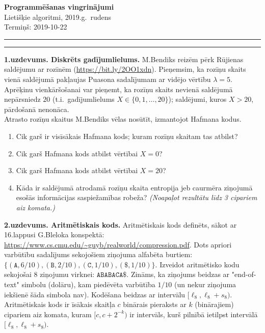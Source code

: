 \documentclass[a4paper,12pt]{article}
\begin{document}
\thispagestyle{empty}

\begin{center}
{\bf\Huge Programmēšanas vingrinājumi} \\[5pt]
Lietišķie algoritmi, 2019.g.\ rudens\\
Termiņš: 2019-10-22
\end{center}

\hrule
\vspace{2pt}
\hrule
\vspace{12pt}


\noindent
{\bf 1.uzdevums. Diskrēts gadījumlielums.}
M.Bendiks reizēm pērk Rūjienas saldējumu ar rozīnēm (\url{https://bit.ly/2OO1xdn}).
Pieņemsim, ka rozīņu skaits vienā saldējumā pakļaujas Puasona sadalījumam 
ar vidējo vērtību $\lambda = 5$. Aprēķinu vienkāršošanai var pieņemt, ka
rozīņu skaits nevienā saldējumā nepārsniedz $20$ (t.i.\ gadījumlielums
$X \in \{ 0,1,\ldots,20 \}$); saldējumi, kuros $X > 20$, 
pārdošanā nenonāca.\\
Atrasto rozīņu skaitus M.Bendiks vēlas nosūtīt, izmantojot Hafmana kodus. 
\begin{enumerate}[label=(\alph*)]
\item Cik garš ir visīsākais Hafmana kods; kuram rozīņu skaitam tas atbilst?
\item Cik garš Hafmana kods atbilst vērtībai $X=0$?
\item Cik garš Hafmana kods atbilst vērtībai $X=20$?
\item Kāda ir saldējumā atrodamā rozīņu skaita entropija jeb caurmēra ziņojumā
esošās informācijas saspiežamības robeža? {\em (Noapaļot rezultātu līdz 3 cipariem 
aiz komata.)}
\end{enumerate}

\vspace{6pt}
{\bf 2.uzdevums. Aritmētiskais kods.}
Aritmētiskais kods definēts, sākot ar 16.lappusi G.Bleloka konspektā: 
\url{https://www.cs.cmu.edu/~guyb/realworld/compression.pdf}. 
Dots apriori varbūtību sadalījums sekojošiem ziņojuma alfabēta 
burtiem: $\{ (\mathtt{A},6/10), (\mathtt{B},2/10), (\mathtt{C},1/10), 
(\mathtt{\$},1/10) \}$. Izveidot aritmētisko kodu sekojošai $8$ ziņojumu virknei:
$\mathtt{ABABACA\$}$.
Zināms, ka ziņojums beidzas ar "end-of-text" simbolu (dolāru), kam piedēvēta varbūtība $1/10$
(un nekur ziņojuma iekšienē šāda simbola nav).  
Kodēšana beidzas ar intervālu $[\ell_8,\ell_8+s_8)$. 
Aritmētiskais kods ir īsākais skaitļa $c$ binārais pieraksts ar $k$ (binārajiem) cipariem 
aiz komata, kuram $[c,c+2^{-k})$ ir intervāls, kurš pilnībā ietilpst
intervālā $[\ell_8,\ell_8+s_8)$.
\end{document}

